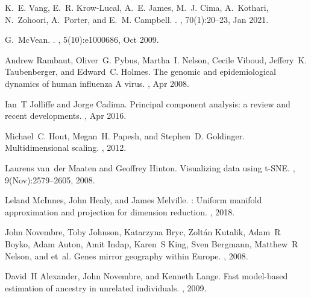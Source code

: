 \documentclass[webpdf,contemporary,large,single]{oup-authoring-template}%
\theoremstyle{thmstyleone}%
\theoremstyle{thmstyletwo}%
\theoremstyle{thmstylethree}%
\begin{document}
\begin{thebibliography}{10}
K.~E. Vang, E.~R. Krow-Lucal, A.~E. James, M.~J. Cima, A.~Kothari, N.~Zohoori,
  A.~Porter, and E.~M. Campbell.
.
, 70(1):20--23, Jan 2021.

G.~McVean.
.
, 5(10):e1000686, Oct 2009.

Andrew Rambaut, Oliver~G. Pybus, Martha~I. Nelson, Cecile Viboud, Jeffery~K.
  Taubenberger, and Edward~C. Holmes.
\newblock The genomic and epidemiological dynamics of human influenza {A}
  virus.
, Apr 2008.

Ian~T Jolliffe and Jorge Cadima.
\newblock Principal component analysis: a review and recent developments.
, Apr 2016.

Michael~C. Hout, Megan~H. Papesh, and Stephen~D. Goldinger.
\newblock Multidimensional scaling.
, 2012.

Laurens van~der Maaten and Geoffrey Hinton.
\newblock Visualizing data using {t-SNE}.
, 9(Nov):2579--2605, 2008.

Leland McInnes, John Healy, and James Melville.
: Uniform manifold approximation and projection for dimension
  reduction.
, 2018.

John Novembre, Toby Johnson, Katarzyna Bryc, Zolt\'{a}n Kutalik, Adam~R Boyko,
  Adam Auton, Amit Indap, Karen~S King, Sven Bergmann, Matthew~R Nelson, and
  et~al.
\newblock Genes mirror geography within {E}urope.
, 2008.

David~H Alexander, John Novembre, and Kenneth Lange.
\newblock Fast model-based estimation of ancestry in unrelated individuals.
, 2009.


\end{thebibliography}
\end{document}
